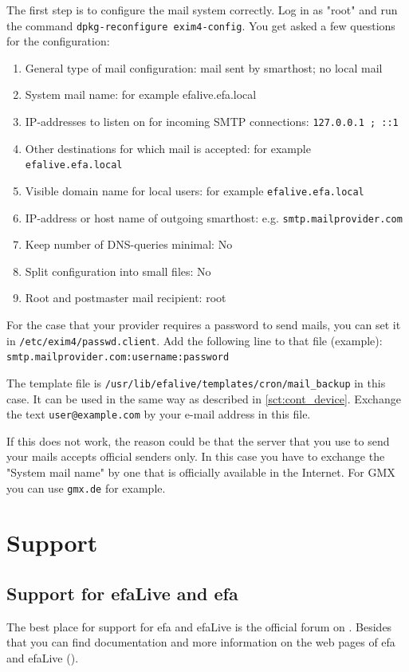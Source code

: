 \documentclass[a4paper,12pt,twoside]{article}
\begin{document}
The first step is to configure the mail system correctly. Log in as
"root" and run the command
\texttt{dpkg-reconfigure exim4-config}. You get
asked a few questions for the configuration:

\begin{enumerate}
    \item General type of mail configuration: mail sent by smarthost; no
        local mail
    \item System mail name: for example efalive.efa.local
    \item IP-addresses to listen on for incoming SMTP connections:
        \texttt{127.0.0.1 ; ::1}
    \item Other destinations for which mail is accepted: for example
        \texttt{efalive.efa.local}
    \item Visible domain name for local users: for example \texttt{efalive.efa.local}
    \item IP-address or host name of outgoing smarthost: e.g.
        \texttt{smtp.mailprovider.com}
    \item Keep number of DNS-queries minimal: No
    \item Split configuration into small files: No
    \item Root and postmaster mail recipient: root
\end{enumerate}

For the case that your provider requires a password to send mails, you
can set it in \texttt{/etc/exim4/passwd.client}. Add the following line to that
file (example):
\bigskip
\\ 
\texttt{smtp.mailprovider.com:username:password}

\bigskip
The template file is \texttt{/usr/lib/efalive/templates/cron/mail\_backup} in
this case. It can be used in the same way as described in \ref{sct:cont_device}.
Exchange the text \texttt{user@example.com} by
your e-mail address in this file.

If this does not work, the reason could be that the server that you use
to send your mails accepts official senders only. In this case you have
to exchange the "System mail name" by one
that is officially available in the Internet. For GMX you can use
\texttt{gmx.de} for example.


\section{Support}
\label{sct:support}
\subsection{Support for efaLive and efa}
\label{sct:support_efa}
The best place for support for efa and efaLive is the official forum on
\cite{EFA3}. Besides that you can find documentation and more
information on the web pages of efa and efaLive
(\cite{EFA1}\cite{EFA4}\cite{EFA5}).
\end{document}
